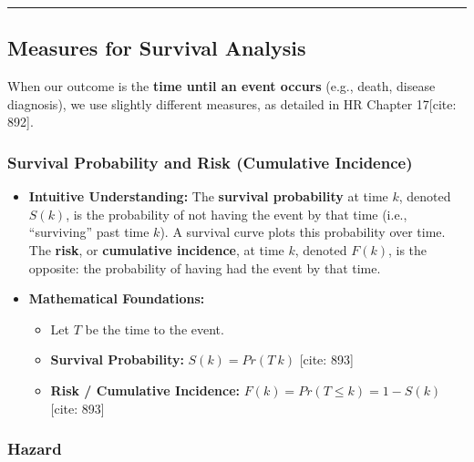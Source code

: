 \documentclass[
  10pt,
  letterpaper,
  DIV=11,
  numbers=noendperiod]{scrartcl}
\providecommand{\tightlist}{%
  \setlength{\itemsep}{0pt}\setlength{\parskip}{0pt}}
\begin{document}
\begin{center}\rule{0.5\linewidth}{0.5pt}\end{center}

\subsection{Measures for Survival
Analysis}\label{measures-for-survival-analysis}

When our outcome is the \textbf{time until an event occurs} (e.g.,
death, disease diagnosis), we use slightly different measures, as
detailed in HR Chapter 17{[}cite: 892{]}.

\subsubsection{\texorpdfstring{\textbf{Survival Probability and Risk
(Cumulative
Incidence)}}{Survival Probability and Risk (Cumulative Incidence)}}\label{survival-probability-and-risk-cumulative-incidence}

\begin{itemize}
\tightlist
\item
  \textbf{Intuitive Understanding:} The \textbf{survival probability} at
  time \(k\), denoted \(S(k)\), is the probability of not having the
  event by that time (i.e., ``surviving'' past time \(k\)). A survival
  curve plots this probability over time. The \textbf{risk}, or
  \textbf{cumulative incidence}, at time \(k\), denoted \(F(k)\), is the
  opposite: the probability of having had the event by that time.
\item
  \textbf{Mathematical Foundations:}

  \begin{itemize}
  \tightlist
  \item
    Let \(T\) be the time to the event.
  \item
    \textbf{Survival Probability:} \(S(k) = Pr(T \> k)\) {[}cite: 893{]}
  \item
    \textbf{Risk / Cumulative Incidence:}
    \(F(k) = Pr(T \le k) = 1 - S(k)\) {[}cite: 893{]}
  \end{itemize}
\end{itemize}

\subsubsection{\texorpdfstring{\textbf{Hazard}}{Hazard}}\label{hazard}
\end{document}
